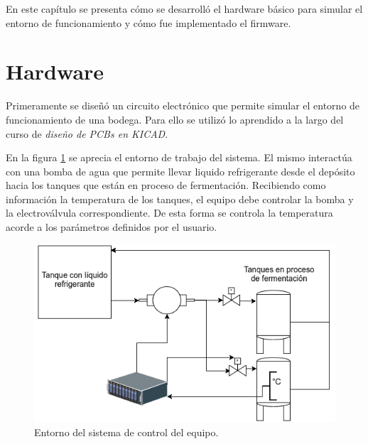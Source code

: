 En este capítulo se presenta cómo se desarrolló el hardware básico para simular el entorno de funcionamiento y cómo fue implementado el firmware.

\section{Hardware}

Primeramente se diseñó un circuito electrónico que permite simular el entorno de funcionamiento de una bodega. Para ello se utilizó lo aprendido a la largo del curso de \emph{diseño de PCBs en KICAD}. 

En la figura \ref{fig:diagrama_sistema} se aprecia el entorno de trabajo del sistema. El mismo interactúa con una bomba de agua que permite llevar liquido refrigerante desde el depósito hacia los tanques que están en proceso de fermentación.
Recibiendo como información la temperatura de los tanques, el equipo debe controlar la bomba y la electroválvula correspondiente. De esta forma se controla la temperatura acorde a los parámetros definidos por el usuario. 


\begin{figure}[!htb]
  \centering
  \includegraphics[scale=0.7]{./Figures/diagrama_del_sistema.png}
  \caption{Entorno del sistema de control del equipo.}
  \label{fig:diagrama_sistema}
\end{figure}

